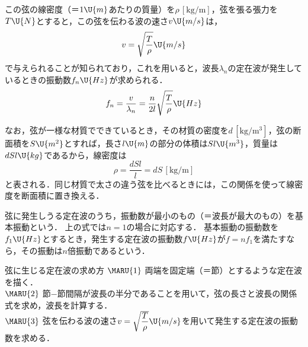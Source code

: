 この弦の線密度（＝$1\U{m}$あたりの質量）を$\rho\,[\mathrm{kg/m}]$，弦を張る張力を$T\U{N}$とすると，この弦を伝わる波の速さ$v\U{m/s}$は，
\[v=\sqrt{\dfrac{T}{\rho}}\U{m/s}\]
で与えられることが知られており，これを用いると，波長$\lambda_n$の定在波が発生しているときの振動数$f_n\U{Hz}$が求められる．
\[f_n=\dfrac{v}{\lambda_n}=\dfrac{n}{2l}\sqrt{\dfrac{T}{\rho}}\U{Hz}\]

なお，弦が一様な材質でできているとき，その材質の密度を$d\,[\mathrm{kg/m^3}]$，弦の断面積を$S\U{m^2}$とすれば，長さ$l\U{m}$の部分の体積は$Sl\U{m^3}$，質量は$dSl\U{kg}$であるから，線密度は
\[\rho=\dfrac{dSl}{l}=dS\,[\mathrm{kg/m}]\]
と表される．{\gtfamily 同じ材質で太さの違う弦を比べるときには，この関係を使って線密度を断面積に置き換える．}

弦に発生しうる定在波のうち，振動数が最小のもの（＝波長が最大のもの）を{\gtfamily 基本振動}という．
上の式では$n=1$の場合に対応する．
基本振動の振動数を$f_1\U{Hz}$とするとき，発生する定在波の振動数$f\U{Hz}$が$f=nf_1$を満たすなら，その振動は\mbox{\boldmath $n$}{\gtfamily 倍振動}であるという．

\begin{matome}{弦に生じる定在波の求め方}
\hspace{3mm} $\MARU{1}$\hspace{2mm} 両端を固定端（＝節）とするような定在波を描く．\\
\hspace{3mm} $\MARU{2}$\hspace{2mm} 節−節間隔が波長の半分であることを用いて，弦の長さと波長の関係式を求め，波長を計算する．\\
\hspace{3mm} $\MARU{3}$\hspace{2mm} 弦を伝わる波の速さ$v=\sqrt{\dfrac{T}{\rho}}\U{m/s}$を用いて発生する定在波の振動数を求める．
\end{matome}

